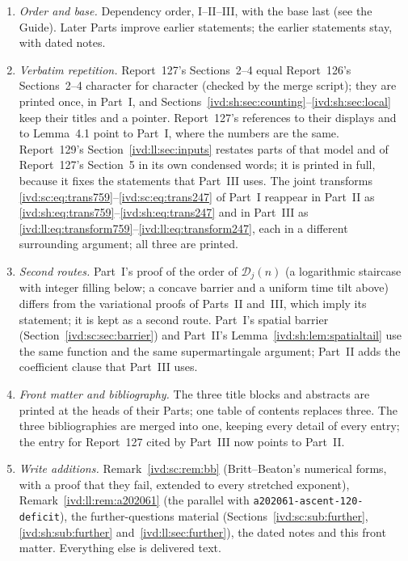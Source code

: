 \documentclass[11pt,letterpaper]{article}
\theoremstyle{remark}\newtheorem{remark}[theorem]{Remark}
\numberwithin{equation}{section}
\newcommand{\file}[1]{\nolinkurl{#1}}
\newcommand{\Dfc}{\mathcal D}
\begin{document}
\begin{enumerate}
\item \emph{Order and base.} Dependency order, I--II--III, with the base last (see the Guide). Later Parts improve earlier statements; the earlier statements stay, with dated notes.
\item \emph{Verbatim repetition.} Report~127's Sections~2--4 equal Report~126's Sections~2--4 character for character (checked by the merge script); they are printed once, in Part~I, and Sections~\ref{ivd:sh:sec:counting}--\ref{ivd:sh:sec:local} keep their titles and a pointer. Report~127's references to their displays and to Lemma~4.1 point to Part~I, where the numbers are the same. Report~129's Section~\ref{ivd:ll:sec:inputs} restates parts of that model and of Report~127's Section~5 in its own condensed words; it is printed in full, because it fixes the statements that Part~III uses. The joint transforms \eqref{ivd:sc:eq:trans759}--\eqref{ivd:sc:eq:trans247} of Part~I reappear in Part~II as \eqref{ivd:sh:eq:trans759}--\eqref{ivd:sh:eq:trans247} and in Part~III as \eqref{ivd:ll:eq:transform759}--\eqref{ivd:ll:eq:transform247}, each in a different surrounding argument; all three are printed.
\item \emph{Second routes.} Part~I's proof of the order of $\Dfc_j(n)$ (a logarithmic staircase with integer filling below; a concave barrier and a uniform time tilt above) differs from the variational proofs of Parts~II and~III, which imply its statement; it is kept as a second route. Part~I's spatial barrier (Section~\ref{ivd:sc:sec:barrier}) and Part~II's Lemma~\ref{ivd:sh:lem:spatialtail} use the same function and the same supermartingale argument; Part~II adds the coefficient clause that Part~III uses.
\item \emph{Front matter and bibliography.} The three title blocks and abstracts are printed at the heads of their Parts; one table of contents replaces three. The three bibliographies are merged into one, keeping every detail of every entry; the entry for Report~127 cited by Part~III now points to Part~II.
\item \emph{Write additions.} Remark~\ref{ivd:sc:rem:bb} (Britt--Beaton's numerical forms, with a proof that they fail, extended to every stretched exponent), Remark~\ref{ivd:ll:rem:a202061} (the parallel with \file{a202061-ascent-120-deficit}), the further-questions material (Sections~\ref{ivd:sc:sub:further}, \ref{ivd:sh:sub:further} and~\ref{ivd:ll:sec:further}), the dated notes and this front matter. Everything else is delivered text.
\end{enumerate}
\end{document}
